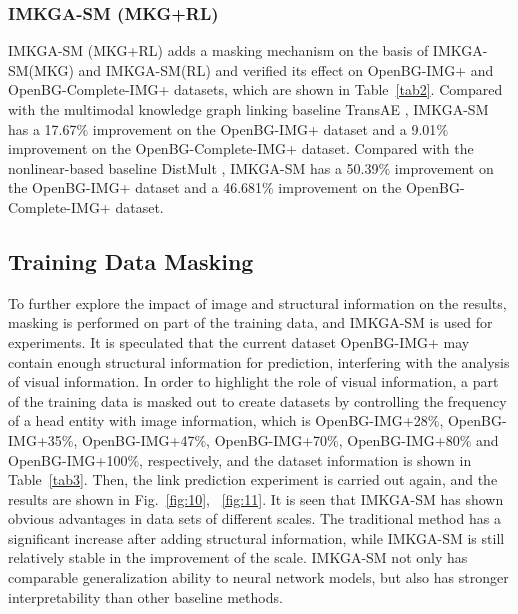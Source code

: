 \documentclass[10pt,journal,compsoc]{IEEEtran}
\begin{document}
\subsubsection{IMKGA-SM (MKG+RL)} IMKGA-SM (MKG+RL) adds a masking mechanism on the basis of IMKGA-SM(MKG) and IMKGA-SM(RL) and verified its effect on OpenBG-IMG+ and OpenBG-Complete-IMG+ datasets, which are shown in Table~\ref{tab2}. Compared with the multimodal knowledge graph linking baseline TransAE \cite{ref14}, IMKGA-SM has a 17.67$\%$ improvement on the OpenBG-IMG+ dataset and a 9.01$\%$ improvement on the OpenBG-Complete-IMG+ dataset. Compared with the nonlinear-based baseline DistMult \cite{ref22}, IMKGA-SM has a 50.39$\%$ improvement on the OpenBG-IMG+ dataset and a 46.681$\%$ improvement on the OpenBG-Complete-IMG+ dataset. 

\subsection{Training Data Masking}
To further explore the impact of image and structural information on the results, masking is performed on part of the training data, and IMKGA-SM is used for experiments. It is speculated that the current dataset OpenBG-IMG+ may contain enough structural information for prediction, interfering with the analysis of visual information. In order to highlight the role of visual information, a part of the training data is masked out to create datasets by controlling the frequency of a head entity with image information, which is OpenBG-IMG+28$\%$, OpenBG-IMG+35$\% $, OpenBG-IMG+47$\%$, OpenBG-IMG+70$\%$, OpenBG-IMG+80$\%$ and OpenBG-IMG+100$\%$, respectively, and the dataset information is shown in Table~\ref{tab3}. Then, the link prediction experiment is carried out again, and the results are shown in Fig.~\ref{fig:10}, 
~\ref{fig:11}. It is seen that IMKGA-SM has shown obvious advantages in data sets of different scales. The traditional method has a significant increase after adding structural information, while IMKGA-SM is still relatively stable in the improvement of the scale. IMKGA-SM not only has comparable generalization ability to neural network models, but also has stronger interpretability than other baseline methods.\par
\end{document}
